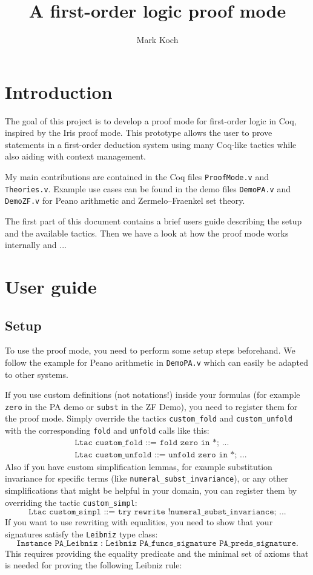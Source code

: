 \documentclass[12pt, a4paper]{article}
\title{A first-order logic proof mode}
\author{Mark Koch}
\newcommand{\coq}[1]{\texttt{#1}}
\begin{document}
\maketitle
\tableofcontents


\section{Introduction}

The goal of this project is to develop a proof mode for first-order logic in Coq, inspired by the Iris proof mode.
This prototype allows the user to prove statements in a first-order deduction system using many Coq-like tactics while also aiding with context management.

My main contributions are contained in the Coq files \texttt{ProofMode.v} and \texttt{Theories.v}. Example use cases can be found in the demo files \texttt{DemoPA.v} and \texttt{DemoZF.v} for Peano arithmetic and Zermelo–Fraenkel set theory.

The first part of this document contains a brief users guide describing the setup and the available tactics.
Then we have a look at how the proof mode works internally and ...


\section{User guide}

\subsection{Setup}

To use the proof mode, you need to perform some setup steps beforehand.
We follow the example for Peano arithmetic in \texttt{DemoPA.v} which can easily be adapted to other systems.

\medskip\noindent
If you use custom definitions (not notations!) inside your formulas (for example \texttt{zero} in the PA demo or \texttt{subst} in the ZF Demo), you need to register them for the proof mode.
Simply override the tactics \texttt{custom\_fold} and \texttt{custom\_unfold} with the corresponding \texttt{fold} and \texttt{unfold} calls like this:
\begin{align*}
	& \coq{Ltac custom_fold ::= fold zero in *; ...} \\
	& \coq{Ltac custom_unfold ::= unfold zero in *; ...}
\end{align*}
Also if you have custom simplification lemmas, for example substitution invariance for specific terms (like \texttt{numeral\_subst\_invariance}), or any other simplifications that might be helpful in your domain, you can register them by overriding the tactic \texttt{custom\_simpl}:
$$\coq{Ltac custom_simpl ::= try rewrite !numeral_subst_invariance; ...}$$
If you want to use rewriting with equalities, you need to show that your signatures satisfy the \texttt{Leibniz} type class:
$$\coq{Instance PA_Leibniz : Leibniz PA_funcs_signature PA_preds_signature.}$$
This requires providing the equality predicate and the minimal set of axioms that is needed for proving the following Leibniz rule:
\end{document}
